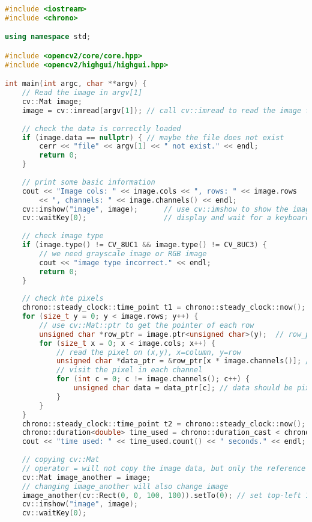\begin{lstlisting}[language=C++,caption=slambook/ch5/imageBasics/imageBasics.cpp]
#include <iostream>
#include <chrono>

using namespace std;

#include <opencv2/core/core.hpp>
#include <opencv2/highgui/highgui.hpp>

int main(int argc, char **argv) {
    // Read the image in argv[1]
    cv::Mat image;
    image = cv::imread(argv[1]); // call cv::imread to read the image from file
    
    // check the data is correctly loaded
    if (image.data == nullptr) { // maybe the file does not exist
        cerr << "file" << argv[1] << " not exist." << endl;
        return 0;
    }
    
    // print some basic information
    cout << "Image cols: " << image.cols << ", rows: " << image.rows 
	    << ", channels: " << image.channels() << endl;
    cv::imshow("image", image);      // use cv::imshow to show the image
    cv::waitKey(0);                  // display and wait for a keyboard input
    
    // check image type
    if (image.type() != CV_8UC1 && image.type() != CV_8UC3) {
        // we need grayscale image or RGB image
        cout << "image type incorrect." << endl;
        return 0;
    }
    
    // check hte pixels
    chrono::steady_clock::time_point t1 = chrono::steady_clock::now();
    for (size_t y = 0; y < image.rows; y++) {
        // use cv::Mat::ptr to get the pointer of each row
        unsigned char *row_ptr = image.ptr<unsigned char>(y);  // row_ptr is the pointer to y-th row
        for (size_t x = 0; x < image.cols; x++) {
            // read the pixel on (x,y), x=column, y=row
            unsigned char *data_ptr = &row_ptr[x * image.channels()]; // data_ptr is the pointer to (x,y)
            // visit the pixel in each channel
            for (int c = 0; c != image.channels(); c++) {
                unsigned char data = data_ptr[c]; // data should be pixel of I(x,y) in c-th channel
            }
        }
    }
    chrono::steady_clock::time_point t2 = chrono::steady_clock::now();
    chrono::duration<double> time_used = chrono::duration_cast < chrono::duration < double >> (t2 - t1);
    cout << "time used: " << time_used.count() << " seconds." << endl;
    
    // copying cv::Mat
    // operator = will not copy the image data, but only the reference
    cv::Mat image_another = image;
    // changing image_another will also change image 
    image_another(cv::Rect(0, 0, 100, 100)).setTo(0); // set top-left 100*100 block to zero
    cv::imshow("image", image);
    cv::waitKey(0);
    

\end{lstlisting}
